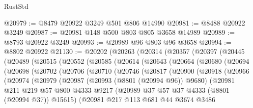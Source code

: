 \begin{lexlean}{RustStd}
\begin{coremodule}
@20979 := @8479 @20922 @3249 @501 @806 @14990
@20981 := @8488 @20922 @3249
@20987 := @20981 @148 @500 @803 @805 @3658 @14989
@20989 := @8793 @20922 @3249
@20993 := @20989 @96 @803 @96 @3658
@20994 := @8802 @20922
@21130 := @20202
    (@20263
      (@20314
        (@20357
          (@20397
            (@20445
              (@20489
                (@20515
                  (@20552
                    (@20585
                      (@20614
                        (@20643
                          (@20664
                            (@20680
                              (@20694
                                (@20698
                                  (@20702
                                    (@20706
                                      (@20710
                                        (@20746
                                          (@20817
                                            (@20900
                                              (@20918
                                                (@20966
                                                  (@20974
                                                    (@20979
                                                      (@20987
                                                        (@20993 (@8801 (@20994 @96)) @9680)
                                                        (@20981
                                                          @211
                                                          @219
                                                          @57
                                                          @800
                                                          @4333
                                                          @9217
                                                          (@20989
                                                            @37
                                                            @57
                                                            @37
                                                            @4333
                                                            (@8801 (@20994 @37))
                                                            @15615)
                                                          (@20981
                                                            @217
                                                            @113
                                                            @681
                                                            @44
                                                            @3674
                                                            @3486

\end{coremodule}
\end{lexlean}
